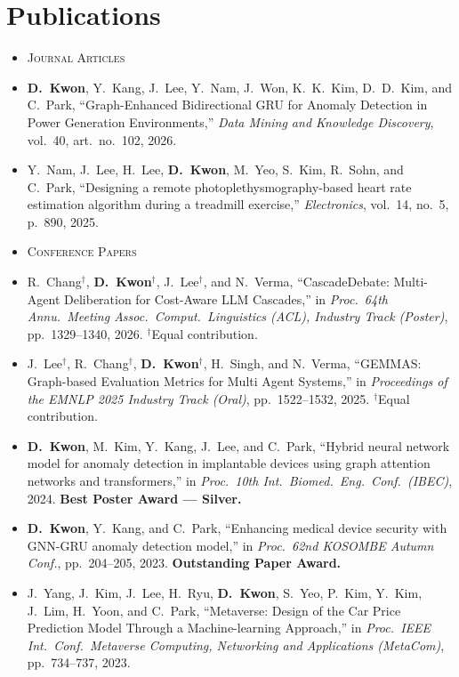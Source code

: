 \documentclass[letterpaper,11pt]{article}
\newcommand{\resumeSubLabel}[1]{\item {\scshape\small #1}\vspace{-3pt}}
\newcommand{\resumeSubHeadingListStart}{\begin{itemize}[leftmargin=0.15in, label={}]}
\newcommand{\resumeSubHeadingListEnd}{\end{itemize}}
\begin{document}
\section{Publications}
  \resumeSubHeadingListStart
    \resumeSubLabel{Journal Articles}
    \item\small{\textbf{D.~Kwon}, Y.~Kang, J.~Lee, Y.~Nam, J.~Won, K.~K.~Kim, D.~D.~Kim, and C.~Park, ``Graph-Enhanced Bidirectional GRU for Anomaly Detection in Power Generation Environments,'' \textit{Data Mining and Knowledge Discovery}, vol.~40, art.~no.~102, 2026.}
    \item\small{Y.~Nam, J.~Lee, H.~Lee, \textbf{D.~Kwon}, M.~Yeo, S.~Kim, R.~Sohn, and C.~Park, ``Designing a remote photoplethysmography-based heart rate estimation algorithm during a treadmill exercise,'' \textit{Electronics}, vol.~14, no.~5, p.~890, 2025.}
    \vspace{2pt}
    \resumeSubLabel{Conference Papers}
    \item\small{R.~Chang$^{\dagger}$, \textbf{D.~Kwon}$^{\dagger}$, J.~Lee$^{\dagger}$, and N.~Verma, ``CascadeDebate: Multi-Agent Deliberation for Cost-Aware LLM Cascades,'' in \textit{Proc.~64th Annu.\ Meeting Assoc.\ Comput.\ Linguistics (ACL), Industry Track (Poster)}, pp.~1329--1340, 2026. $^{\dagger}$Equal contribution.}
    \item\small{J.~Lee$^{\dagger}$, R.~Chang$^{\dagger}$, \textbf{D.~Kwon}$^{\dagger}$, H.~Singh, and N.~Verma, ``GEMMAS: Graph-based Evaluation Metrics for Multi Agent Systems,'' in \textit{Proceedings of the EMNLP 2025 Industry Track (Oral)}, pp.~1522--1532, 2025. $^{\dagger}$Equal contribution.}
    \item\small{\textbf{D.~Kwon}, M.~Kim, Y.~Kang, J.~Lee, and C.~Park, ``Hybrid neural network model for anomaly detection in implantable devices using graph attention networks and transformers,'' in \textit{Proc.\ 10th Int.\ Biomed.\ Eng.\ Conf.\ (IBEC)}, 2024. \textbf{Best Poster Award --- Silver.}}
    \item\small{\textbf{D.~Kwon}, Y.~Kang, and C.~Park, ``Enhancing medical device security with GNN-GRU anomaly detection model,'' in \textit{Proc.\ 62nd KOSOMBE Autumn Conf.}, pp.~204--205, 2023. \textbf{Outstanding Paper Award.}}
    \item\small{J.~Yang, J.~Kim, J.~Lee, H.~Ryu, \textbf{D.~Kwon}, S.~Yeo, P.~Kim, Y.~Kim, J.~Lim, H.~Yoon, and C.~Park, ``Metaverse: Design of the Car Price Prediction Model Through a Machine-learning Approach,'' in \textit{Proc.\ IEEE Int.\ Conf.\ Metaverse Computing, Networking and Applications (MetaCom)}, pp.~734--737, 2023.}
  \resumeSubHeadingListEnd
\end{document}
